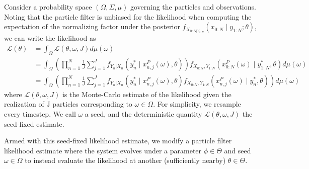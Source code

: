 \documentclass{article}
\begin{document}
\begin{defn}
\label{defn:seed-fixing}
Consider a probability space $(\Omega, \Sigma, \mu)$ governing the particles and observations. Noting that the particle filter is unbiased for the likelihood when computing the expectation of the normalizing factor under the posterior $f_{X_{0:N|Y_{1:N}}}\left(x_{0: N} \mid y_{1: N}; \theta\right)$, we can write the likelihood as
$$
\begin{aligned}
\mathcal{L}(\theta) & =\int_{\Omega} \mathcal{L}(\theta, \omega, J) d \mu(\omega) \\
& =\int_{\Omega}\left(\prod_{n=1}^N \frac{1}{J} \sum_{j=1}^J f_{Y_n|X_n}\left(y_n^* \mid x_{n, j}^P(\omega), \theta\right)\right) f_{X_{0:N}, Y_{1:N}}\left(x_{0: N}^P(\omega) \mid y_{1: N}^*, \theta\right) d \mu(\omega) \\
& =\int_{\Omega}\left(\prod_{n=1}^N \frac{1}{J} \sum_{j=1}^J f_{Y_n|X_n}\left(y_n^* \mid x_{n, j}^P(\omega), \theta\right) f_{X_{0:N}, Y_{1:N}}\left(x_{n, j}^P(\omega) \mid y_n^*, \theta\right)\right) d \mu(\omega)
\end{aligned}
$$
where $\mathcal{L}(\theta, \omega, J)$ is the Monte-Carlo estimate of the likelihood given the realization of $\mathrm{J}$ particles corresponding to $\omega \in \Omega$. For simplicity, we resample every timestep. We call $\omega$ a seed, and the deterministic quantity $\mathcal{L}(\theta, \omega, J)$ the seed-fixed estimate.
\end{defn}

Armed with this seed-fixed likelihood estimate, we modify a particle filter likelihood estimate where the system evolves under a parameter $\phi \in \Theta$ and seed $\omega \in \Omega$ to instead evaluate the likelihood at another (sufficiently nearby) $\theta \in \Theta.$ 
\end{document}
